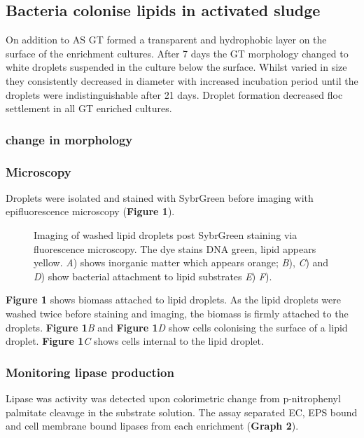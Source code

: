 \documentclass[11pt]{article}
\begin{document}
\subsection{Bacteria colonise lipids in activated sludge}
On addition to AS GT formed a transparent and hydrophobic layer on the surface of the enrichment cultures. After 7 days the GT morphology changed to white droplets suspended in the culture below the surface. Whilst varied in size they consistently decreased in diameter with increased incubation period until the droplets were indistinguishable after 21 days. Droplet formation decreased floc settlement in all GT enriched cultures.

\subsubsection{change in morphology}

\subsubsection{Microscopy}
 Droplets were isolated and stained with SybrGreen before imaging with epifluorescence microscopy (\textbf{Figure 1}). 

\begin{figure}
\caption{Imaging of washed lipid droplets post SybrGreen staining via fluorescence microscopy. The dye stains DNA green, lipid appears yellow. \textit{A}) shows inorganic matter which appears orange; \textit{B}), \textit{C}) and \textit{D}) show bacterial attachment to lipid substrates \textit{E}) \textit{F}).}
\end{figure}


\textbf{Figure 1 } shows biomass attached to lipid droplets. As the lipid droplets were washed twice before staining and imaging, the biomass is firmly attached to the droplets. \textbf{Figure 1}\textit{B} and \textbf{Figure 1}\textit{D} show cells colonising the surface of a lipid droplet. \textbf{Figure 1}\textit{C} shows cells internal to the lipid droplet.

\subsubsection{Monitoring lipase production}
Lipase was activity was detected upon colorimetric change from p-nitrophenyl palmitate cleavage in the substrate solution. The assay separated  EC, EPS bound and cell membrane bound lipases from each enrichment (\textbf{Graph 2}).
\end{document}
